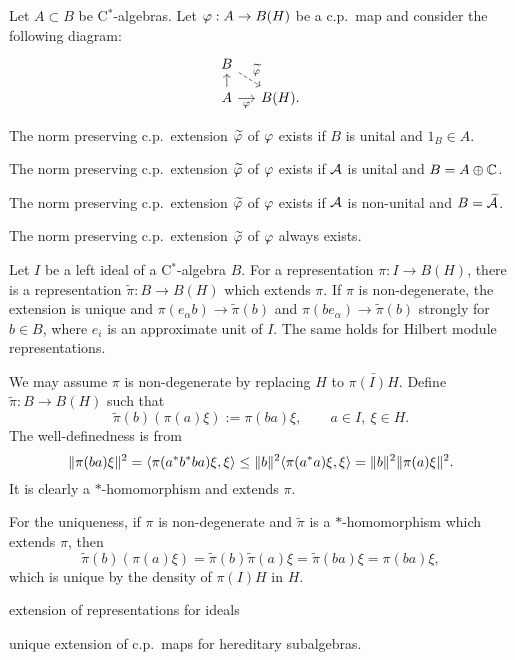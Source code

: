 \documentclass{../../large}
\begin{document}
\begin{prb}
Let $A\subset B$ be C$^*$-algebras.
Let $\varphi:A\to B(H)$ be a c.p.~map and consider the following diagram:
\[\begin{tikzcd}[sep=small]
B\ar[dashed]{dr}{\tilde\f}&\\
A\ar{u}\ar[swap]{r}{\f}&B(H).
\end{tikzcd}\]
\begin{parts}
\item The norm preserving c.p.~extension $\widetilde{\varphi}$ of $\varphi$ exists if $B$ is unital and $1_B\in A$.
\item The norm preserving c.p.~extension $\widetilde{\varphi}$ of $\varphi$ exists if $\mathcal{A}$ is unital and $B=A\oplus\mathbb{C}$.
\item The norm preserving c.p.~extension $\widetilde{\varphi}$ of $\varphi$ exists if $\mathcal{A}$ is non-unital and $B=\widetilde{\mathcal{A}}$.
\item The norm preserving c.p.~extension $\widetilde{\varphi}$ of $\varphi$ always exists.
\end{parts}
\end{prb}



\begin{prb}
Let $I$ be a left ideal of a C$^*$-algebra $B$.
For a representation $\pi:I\to B(H)$, there is a representation $\tilde\pi:B\to B(H)$ which extends $\pi$.
If $\pi$ is non-degenerate, the extension is unique and $\pi(e_\alpha b)\to\tilde\pi(b)$ and $\pi(be_\alpha)\to\tilde\pi(b)$ strongly for $b\in B$, where $e_i$ is an approximate unit of $I$.
The same holds for Hilbert module representations.
\end{prb}
\begin{pf}
We may assume $\pi$ is non-degenerate by replacing $H$ to $\bar{\pi(I)H}$.
Define $\tilde\pi:B\to B(H)$ such that
\[\tilde\pi(b)(\pi(a)\xi):=\pi(ba)\xi,\qquad a\in I,\ \xi\in H.\]
The well-definedness is from
\[\|\pi(ba)\xi\|^2=\langle\pi(a^*b^*ba)\xi,\xi\rangle\le\|b\|^2\langle\pi(a^*a)\xi,\xi\rangle=\|b\|^2\|\pi(a)\xi\|^2.\]
It is clearly a $*$-homomorphism and extends $\pi$.

For the uniqueness, if $\pi$ is non-degenerate and $\tilde\pi$ is a $*$-homomorphism which extends $\pi$, then
\[\tilde\pi(b)(\pi(a)\xi)=\tilde\pi(b)\tilde\pi(a)\xi=\tilde\pi(ba)\xi=\pi(ba)\xi,\]
which is unique by the density of $\pi(I)H$ in $H$.
\end{pf}

extension of representations for ideals

unique extension of c.p.~maps for hereditary subalgebras.
\end{document}
